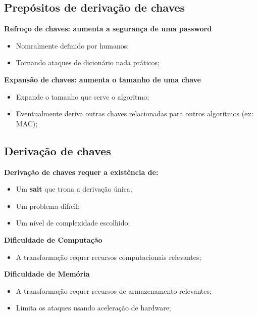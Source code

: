 \documentclass{article}
\begin{document}
\subsection{Prepósitos de derivação de chaves}

\begin{flushleft}
  \textbf{Refroço de chaves: aumenta a segurança de uma password}
  \begin{itemize}
    \item Nomralmente definido por humanos;
    \item Tornando ataques de dicionário nada práticos;
  \end{itemize}

  \vspace{2mm}

  \textbf{Expansão de chaves: aumenta o tamanho de uma chave}
  \begin{itemize}
    \item Expande o tamanho que serve o algoritmo;
    \item Eventualmente deriva outras chaves relacionadas para outros algoritmos (ex: MAC);
  \end{itemize}
\end{flushleft}

\subsection{Derivação de chaves}

\begin{flushleft}
  \textbf{Derivação de chaves requer a existência de:}
  \begin{itemize}
    \item Um \textbf{salt} que trona a derivação única;
    \item Um problema difícil;
    \item Um nível de complexidade escolhido;
  \end{itemize}

  \vspace{2mm}

  \textbf{Dificuldade de Computação}
  \begin{itemize}
    \item A transformação requer recursos computacionais relevantes;
  \end{itemize}

  \vspace{2mm}

  \textbf{Dificuldade de Memória}
  \begin{itemize}
    \item A transformação requer recursos de armazenamento relevantes;
    \item Limita os ataques usando aceleração de hardware;
  \end{itemize}
\end{flushleft}
\end{document}
